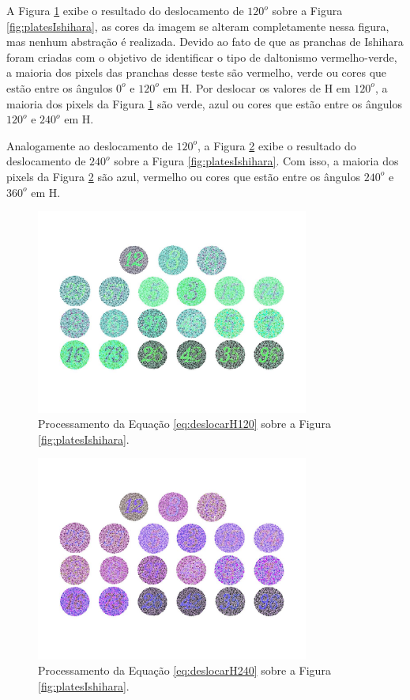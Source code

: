 \documentclass[	12pt, Times, openright, twoside, a4paper, english, brazil]{abntex2}
\begin{document}
A Figura \ref{fig:deslocamento120} exibe o resultado do deslocamento de $120^o$  sobre a Figura \ref{fig:platesIshihara}, as cores da imagem se alteram completamente nessa figura, mas nenhum abstração é realizada. Devido ao fato de que as pranchas de Ishihara foram criadas com o objetivo de identificar o tipo de daltonismo vermelho-verde, a maioria dos pixels das pranchas desse teste são vermelho, verde ou cores que estão entre os ângulos $0^o$ e $120^o$ em H. Por deslocar os valores de H em $120^o$, a maioria dos pixels da Figura \ref{fig:deslocamento120} são verde, azul ou cores que estão entre os ângulos $120^o$ e $240^o$ em H.

Analogamente ao deslocamento de $120^o$, a Figura \ref{fig:deslocamento240} exibe o resultado do deslocamento de $240^o$ sobre a Figura \ref{fig:platesIshihara}. Com isso, a maioria dos pixels da Figura \ref{fig:deslocamento240} são azul, vermelho ou cores que estão entre os ângulos $240^o$ e $360^o$ em H.

\begin{figure}[!htb]
\centering \includegraphics[width=0.80\textwidth]{figuraDeslocar120.jpg}
\caption{Processamento da Equação \ref{eq:deslocarH120} sobre a Figura \ref{fig:platesIshihara}. \label{fig:deslocamento120}}
\end{figure}

\begin{figure}[!htb]
\centering \includegraphics[width=0.80\textwidth]{figuraDeslocar240.jpg}
\caption{Processamento da Equação \ref{eq:deslocarH240} sobre a Figura \ref{fig:platesIshihara}. \label{fig:deslocamento240}}
\end{figure}
\end{document}
